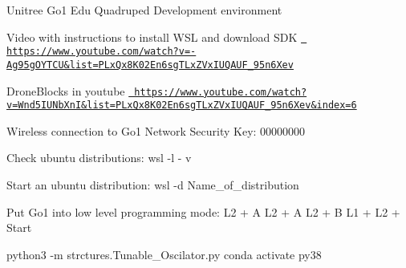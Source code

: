 Unitree Go1 Edu Quadruped Development environment

Video with instructions to install WSL and download SDK \href{https://www.youtube.com/watch?v=-Ag95gOYTCU&list=PLxQx8K02En6sgTLxZVxIUQAUF_95n6Xev}{\texttt{ https\+://www.\+youtube.\+com/watch?v=-\/\+Ag95g\+OYTCU\&list=\+PLx\+Qx8\+K02\+En6sg\+TLx\+ZVx\+IUQAUF\+\_\+95n6\+Xev}}

Drone\+Blocks in youtube \href{https://www.youtube.com/watch?v=Wnd5IUNbXnI&list=PLxQx8K02En6sgTLxZVxIUQAUF_95n6Xev&index=6}{\texttt{ https\+://www.\+youtube.\+com/watch?v=\+Wnd5\+IUNb\+Xn\+I\&list=\+PLx\+Qx8\+K02\+En6sg\+TLx\+ZVx\+IUQAUF\+\_\+95n6\+Xev\&index=6}}

Wireless connection to Go1 Network Security Key\+: 00000000

Check ubuntu distributions\+: wsl -\/l -\/ v

Start an ubuntu distribution\+: wsl -\/d Name\+\_\+of\+\_\+distribution

Put Go1 into low level programming mode\+: L2 + A L2 + A L2 + B L1 + L2 + Start

python3 -\/m strctures.\+Tunable\+\_\+\+Oscilator.\+py conda activate py38 